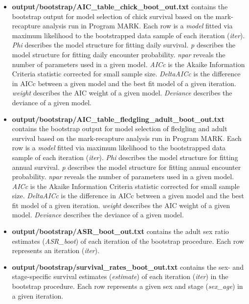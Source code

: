 \documentclass[]{article}
\begin{document}
\begin{itemize}
\item
  \textbf{output/bootstrap/AIC\_table\_chick\_boot\_out.txt} contains
  the bootstrap output for model selection of chick survival based on
  the mark-recapture analysis run in Program MARK. Each row is a
  \emph{model} fitted via maximum likelihood to the bootstrapped data
  sample of each iteration (\emph{iter}). \emph{Phi} describes the model
  structure for fitting daily survival. \emph{p} describes the model
  structure for fitting daily encounter probability. \emph{npar} reveals
  the number of parameters used in a given model. \emph{AICc} is the
  Akaike Information Criteria statistic corrected for small sample size.
  \emph{DeltaAICc} is the difference in AICc between a given model and
  the best fit model of a given iteration. \emph{weight} describes the
  AIC weight of a given model. \emph{Deviance} describes the deviance of
  a given model.
\item
  \textbf{output/bootstrap/AIC\_table\_fledgling\_adult\_boot\_out.txt}
  contains the bootstrap output for model selection of fledgling and
  adult survival based on the mark-recapture analysis run in Program
  MARK. Each row is a \emph{model} fitted via maximum likelihood to the
  bootstrapped data sample of each iteration (\emph{iter}). \emph{Phi}
  describes the model structure for fitting annual survival. \emph{p}
  describes the model structure for fitting annual encounter
  probability. \emph{npar} reveals the number of parameters used in a
  given model. \emph{AICc} is the Akaike Information Criteria statistic
  corrected for small sample size. \emph{DeltaAICc} is the difference in
  AICc between a given model and the best fit model of a given
  iteration. \emph{weight} describes the AIC weight of a given model.
  \emph{Deviance} describes the deviance of a given model.
\item
  \textbf{output/bootstrap/ASR\_boot\_out.txt} contains the adult sex
  ratio estimates (\emph{ASR\_boot}) of each iteration of the bootstrap
  procedure. Each row represents an iteration (\emph{iter}).
\item
  \textbf{output/bootstrap/survival\_rates\_boot\_out.txt} contains the
  sex- and stage-specific survival estimates (\emph{estimate}) of each
  iteration (\emph{iter}) in the bootstrap procedure. Each row
  represents a given sex and stage (\emph{sex\_age}) in a given
  iteration.
\end{itemize}
\end{document}
